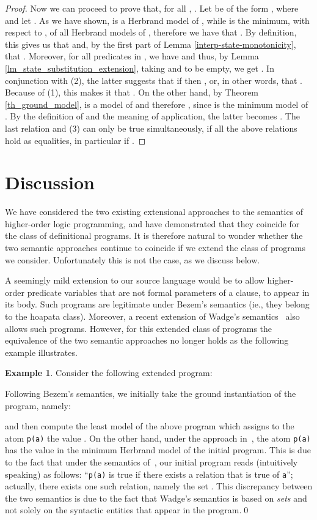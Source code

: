 \documentclass[submission,copyright]{eptcs}
\theoremstyle{definition}
\newtheorem{example}{Example}
\begin{document}
\begin{proof}
Now we can proceed to prove that, for all , .
Let  be of the form , where
 and let
. As we have shown,
 is a Herbrand model of , while  is the minimum, with respect to , of all Herbrand models of ,
therefore we have that . By definition, this gives us that
 and,
by the first part of Lemma \ref{interp-state-monotonicity}, that
.
Moreover, for all predicates  in , we have  and thus,
by Lemma \ref{lm_state_substitution_extension}, taking  and  to be empty,
we get . In conjunction with (2), the latter suggests
that if  then ,
or, in other words, that .
Because of (1), this makes it that
. On the
other hand, by Theorem \ref{th_ground_model},  is a model of  and therefore , since  is the minimum model of . By the definition of  and the meaning of application, the latter becomes
. The last relation and (3) can only be true simultaneously, if all the above relations hold as equalities, in particular if .
\end{proof}

\section{Discussion}
\label{sec:concl}
\label{section5}
We have considered the two existing extensional approaches to the semantics of higher-order
logic programming, and have demonstrated that they coincide for the class of definitional
programs. It is therefore natural to wonder whether the two semantic approaches continue
to coincide if we extend the class of programs we consider. Unfortunately this is not
the case, as we discuss below.

A seemingly mild extension to our source language would be to allow higher-order predicate
variables that are not formal parameters of a clause, to appear in its body. Such programs
are legitimate under Bezem's semantics (ie., they belong to the hoapata class). Moreover,
a recent extension of Wadge's semantics~\cite{CharalambidisHRW13} also allows such programs.
However, for this extended class of programs the equivalence of the two semantic approaches
no longer holds as the following example illustrates.
\begin{example}
Consider the following extended program:

Following Bezem's semantics, we initially take the ground instantiation of the program, namely:

and then compute the least model of the above program which assigns to the atom
{\tt p(a)} the value . On the other hand, under the approach
in~\cite{CharalambidisHRW13}, the atom {\tt p(a)} has the value 
in the minimum Herbrand model of the initial program. This is due to the fact that
under the semantics of~\cite{CharalambidisHRW13}, our initial program reads (intuitively
speaking) as follows: ``{\tt p(a)} is true if there exists a relation that is
true of {\tt a}''; actually, there exists one such relation, namely the set .
This discrepancy between the two semantics is due to the fact that Wadge's semantics is
based on {\em sets} and not solely on the syntactic entities that appear in the
program.\qed
\end{example}
\end{document}
